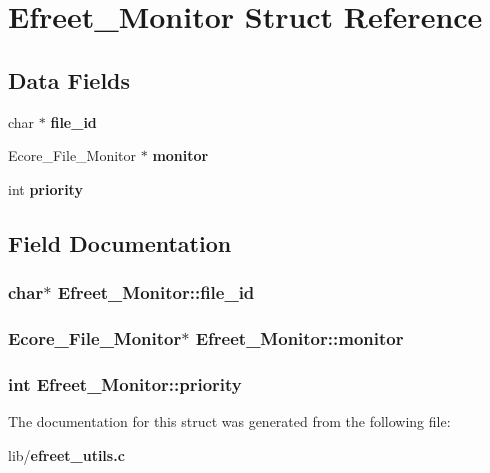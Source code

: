 \section{Efreet\_\-Monitor Struct Reference}
\label{structEfreet__Monitor}
\subsection*{Data Fields}
\begin{CompactItemize}
\item 
char $\ast$ {\bf file\_\-id}
\item 
Ecore\_\-File\_\-Monitor $\ast$ {\bf monitor}
\item 
int {\bf priority}
\end{CompactItemize}


\subsection{Field Documentation}
\subsubsection{\setlength{\rightskip}{0pt plus 5cm}char$\ast$ {\bf Efreet\_\-Monitor::file\_\-id}}\label{structEfreet__Monitor_7f26a3b08d48d6768c0afbf96b83b69f}


\subsubsection{\setlength{\rightskip}{0pt plus 5cm}Ecore\_\-File\_\-Monitor$\ast$ {\bf Efreet\_\-Monitor::monitor}}\label{structEfreet__Monitor_7c78d446e9c619d4afaeaf1c0cb609e9}


\subsubsection{\setlength{\rightskip}{0pt plus 5cm}int {\bf Efreet\_\-Monitor::priority}}\label{structEfreet__Monitor_8056cc07aac3807b09e26849dfbd08e2}




The documentation for this struct was generated from the following file:\begin{CompactItemize}
\item 
lib/{\bf efreet\_\-utils.c}\end{CompactItemize}
